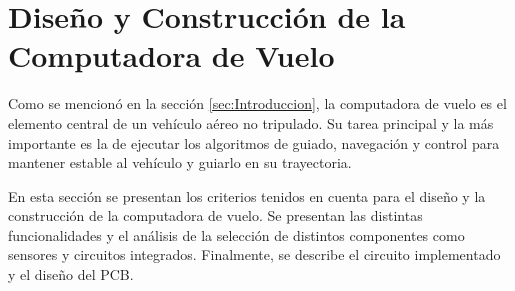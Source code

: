 \section{Diseño y Construcción de la Computadora de Vuelo}\label{sec:disenio_computadora_de_vuelo}



Como se mencionó en la sección \ref{sec:Introduccion}, la computadora de vuelo es el elemento central de un vehículo aéreo no tripulado. Su tarea principal y la más importante es la de ejecutar los algoritmos de guiado, navegación y control para mantener estable al vehículo y guiarlo en su trayectoria.

En esta sección se presentan los criterios tenidos en cuenta para el diseño y la construcción de la computadora de vuelo. Se presentan las distintas funcionalidades y el análisis de la selección de distintos componentes como sensores y circuitos integrados. Finalmente, se describe el circuito implementado y el diseño del PCB.






